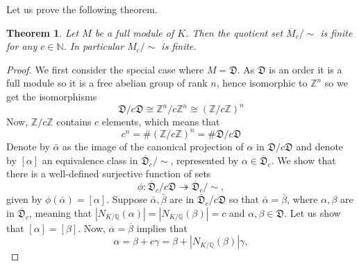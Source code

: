 \documentclass{article}
\newtheorem{theorem}{Theorem}[section]
\newcommand{\mfrak}[1]{\mathfrak{#1}}
\newcommand{\mbb}[1]{\mathbb{#1}}
\numberwithin{equation}{section}
\begin{document}
Let us prove the following theorem.
\begin{theorem}\label{thm: Finitely many solutions up to assoc}
	Let $M$ be a full module of $K$. Then the quotient set $\overline M_c / \sim$ is finite for any $c \in \mbb N$. In particular $M_c / \sim$ is finite.
\end{theorem}
\begin{proof}
	We first consider the special case where $M = \mfrak D$. As $\mfrak D$ is an order it is a full module so it is a free abelian group of rank $n$, hence isomorphic to $\mbb Z^n$ so we get the isomorphisms
	$$\mfrak D/c \mfrak D \cong \mbb Z^n/c \mbb Z^n \cong (\mbb Z/c \mbb Z)^n$$
	Now, $\mbb Z / c \mbb Z$ contains $c$ elements, which means that
	$$c^n = \# (\mbb Z/c \mbb Z)^n = \# \mfrak D/c \mfrak D$$
	Denote by $\bar \alpha$ as the image of the canonical projection of $\alpha$ in $\mfrak D/c \mfrak D$ and denote by $[\alpha]$ an equivalence class in $\overline {\mfrak D}_c / \sim$, represented by $\alpha \in \overline {\mfrak D}_c$. We show that there is a well-defined surjective function of sets
	$$\phi : \overline {\mfrak D}_c /c \mfrak D \twoheadrightarrow  \overline {\mfrak D}_c / \sim,$$
	given by $\phi(\bar \alpha) = [\alpha]$. Suppose $\bar \alpha, \bar \beta$ are in $\overline {\mfrak D}_c /c \mfrak D$ so that $\bar \alpha = \bar \beta$, where $\alpha, \beta$ are in $\overline {\mfrak D}_c$, meaning that $|N_{K/\mbb Q}(\alpha)| = |N_{K/\mbb Q}(\beta)| = c$ and $\alpha, \beta \in \mfrak D$. Let us show that $[\alpha] = [\beta]$. Now, $\overline \alpha = \overline \beta$ implies that
	$$\alpha = \beta + c \gamma = \beta + |N_{K/\mbb Q}(\beta)| \gamma,$$

\end{proof}
\end{document}
